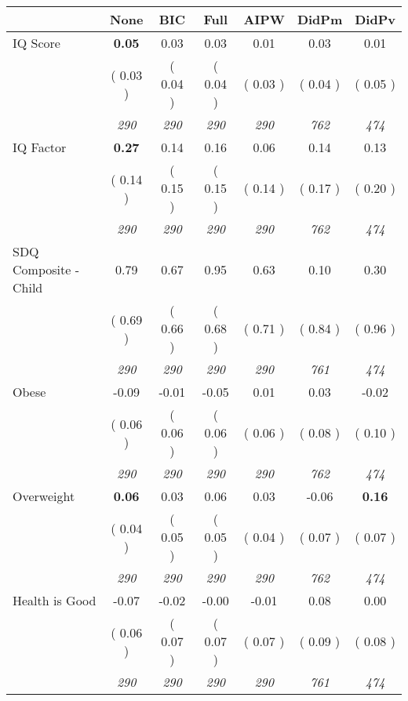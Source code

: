 \begin{tabular}{l c c c c c c}
\toprule
 & None & BIC & Full & AIPW & DidPm & DidPv \\
\midrule
IQ Score & \textbf{      0.05 } &      0.03 &      0.03 &      0.01 &      0.03 &      0.01 \\
& (     0.03 ) & (     0.04 ) & (     0.04 ) & (     0.03 ) & (     0.04 ) & (     0.05 ) \\
& \textit{ 290 } & \textit{ 290 } & \textit{ 290 } & \textit{ 290 } & \textit{ 762 } & \textit{ 474 } \\
IQ Factor & \textbf{      0.27 } &      0.14 &      0.16 &      0.06 &      0.14 &      0.13 \\
& (     0.14 ) & (     0.15 ) & (     0.15 ) & (     0.14 ) & (     0.17 ) & (     0.20 ) \\
& \textit{ 290 } & \textit{ 290 } & \textit{ 290 } & \textit{ 290 } & \textit{ 762 } & \textit{ 474 } \\
SDQ Composite - Child &      0.79 &      0.67 &      0.95 &      0.63 &      0.10 &      0.30 \\
& (     0.69 ) & (     0.66 ) & (     0.68 ) & (     0.71 ) & (     0.84 ) & (     0.96 ) \\
& \textit{ 290 } & \textit{ 290 } & \textit{ 290 } & \textit{ 290 } & \textit{ 761 } & \textit{ 474 } \\
Obese &     -0.09 &     -0.01 &     -0.05 &      0.01 &      0.03 &     -0.02 \\
& (     0.06 ) & (     0.06 ) & (     0.06 ) & (     0.06 ) & (     0.08 ) & (     0.10 ) \\
& \textit{ 290 } & \textit{ 290 } & \textit{ 290 } & \textit{ 290 } & \textit{ 762 } & \textit{ 474 } \\
Overweight & \textbf{      0.06 } &      0.03 &      0.06 &      0.03 &     -0.06 & \textbf{      0.16 } \\
& (     0.04 ) & (     0.05 ) & (     0.05 ) & (     0.04 ) & (     0.07 ) & (     0.07 ) \\
& \textit{ 290 } & \textit{ 290 } & \textit{ 290 } & \textit{ 290 } & \textit{ 762 } & \textit{ 474 } \\
Health is Good &     -0.07 &     -0.02 &     -0.00 &     -0.01 &      0.08 &      0.00 \\
& (     0.06 ) & (     0.07 ) & (     0.07 ) & (     0.07 ) & (     0.09 ) & (     0.08 ) \\
& \textit{ 290 } & \textit{ 290 } & \textit{ 290 } & \textit{ 290 } & \textit{ 761 } & \textit{ 474 } \\

\end{tabular}
